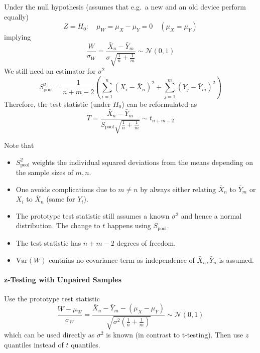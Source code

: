 Under the null hypothesis (assumes that e.g.\ a new and an old device perform equally)
\begin{equation*}
    Z=H_0{:}\quad \mu_W = \mu_X-\mu_Y=0\quad(\mu_X=\mu_Y)
\end{equation*}
implying
\begin{equation*}
    \frac{W}{\sigma_W} = \frac{\bar{X}_n-\bar{Y}_m}{\sigma\sqrt{\frac{1}{n}+\frac{1}{m}}}\sim\mathcal{N}(0,1)
\end{equation*}
We still need an estimator for $\sigma^2$
\begin{equation*}
    S_{\text{pool}}^2=\frac{1}{n+m-2}\left(\sum_{i=1}^n{(X_i-\bar{X}_n)}^2+\sum_{j=1}^m{(Y_j-\bar{Y}_m)}^2\right)
\end{equation*}
Therefore, the test statistic (under $H_0$) can be reformulated as
\begin{equation*}
    T=\frac{\bar{X}_n-\bar{Y}_m}{S_\text{pool}\sqrt{\frac1n+\frac1m}}\sim t_{n+m-2}
\end{equation*}

\newpar{}

Note that
\begin{itemize}
    \item $S_{\text{pool}}^2$ weights the individual squared deviations from the means depending on the sample sizes of $m,n$.
    \item One avoids complications due to $m \neq n$ by always either relating $\bar{X}_n$ to $\bar{Y}_m$ or $X_i$ to $\bar{X}_n$ (same for $Y_i$).
    \item The prototype test statistic still assumes a known $\sigma^2$ and hence a normal distribution. The change to $t$ happens using $S_\text{pool}$.
    \item The test statistic has $n+m-2$ degrees of freedom.
    \item $\mathrm{Var}(W)$ contains no covariance term as independence of $\bar{X}_n,\bar{Y}_n$ is assumed.
\end{itemize}

\paragraph{z-Testing with Unpaired Samples}

Use the prototype test statistic
\begin{equation*}
    \frac{W-\mu_W}{\sigma_W}=\frac{\bar{X}_n-\bar{Y}_m-(\mu_X-\mu_Y)}{\sqrt{\sigma^2\left(\frac{1}{n}+\frac{1}{m}\right)}}\sim\mathcal{N}(0,1)
\end{equation*}
which can be used directly as $\sigma^2$ is known (in contrast to t-testing).
Then use $z$ quantiles instead of $t$ quantiles.